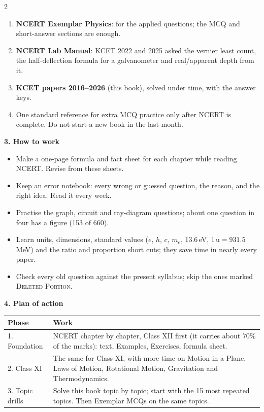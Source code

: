 \begin{multicols}{2}
\begin{enumerate}[leftmargin=1.3em,itemsep=2pt,topsep=0pt]
\item \textbf{NCERT Exemplar Physics}: for the applied questions; the MCQ and short-answer sections are enough.
\item \textbf{NCERT Lab Manual}: KCET 2022 and 2025 asked the vernier least count, the half-deflection formula for a galvanometer and real/apparent depth from it.
\item \textbf{KCET papers 2016--2026} (this book), solved under time, with the answer keys.
\item One standard reference for extra MCQ practice only after NCERT is complete. Do not start a new book in the last month.
\end{enumerate}\medskip
\textbf{\color{crimson}3. How to work}\par\smallskip
\begin{itemize}[leftmargin=1.1em,itemsep=2pt,topsep=0pt]
\item Make a one-page formula and fact sheet for each chapter while reading NCERT. Revise from these sheets.
\item Keep an error notebook: every wrong or guessed question, the reason, and the right idea. Read it every week.
\item Practise the graph, circuit and ray-diagram questions; about one question in four has a figure (153 of 660).
\item Learn units, dimensions, standard values ($e$, $h$, $c$, $m_e$, 13.6\,eV, $1\,\mathrm u = 931.5$\,MeV) and the ratio and proportion short cuts; they save time in nearly every paper.
\item Check every old question against the present syllabus; skip the ones marked \textsc{Deleted Portion}.
\end{itemize}
\columnbreak
\textbf{\color{crimson}4. Plan of action}\par\smallskip
{\small\renewcommand{\arraystretch}{1.25}
\begin{tabularx}{\linewidth}{@{}l>{\raggedright\arraybackslash}X@{}}\toprule
Phase & Work\\\midrule
1. Foundation & NCERT chapter by chapter, Class XII first (it carries about 70\% of the marks): text, Examples, Exercises, formula sheet.\\
2. Class XI & The same for Class XI, with more time on Motion in a Plane, Laws of Motion, Rotational Motion, Gravitation and Thermodynamics.\\
3. Topic drills & Solve this book topic by topic; start with the 15 most repeated topics. Then Exemplar MCQs on the same topics.\\

\end{tabularx}}
\end{multicols}
